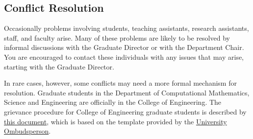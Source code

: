 \subsection{Conflict Resolution}

Occasionally problems involving students, teaching assistants,
research assistants, staff, and faculty arise.  Many of these problems
are likely to be resolved by informal discussions with the Graduate
Director or with the Department Chair.  You are encouraged to contact
these individuals with any issues that may arise, starting with the
Graduate Director.

In rare cases, however, some conflicts may need a more formal
mechanism for resolution.  Graduate students in the Department of
Computational Mathematics, Science and Engineering are officially in
the College of Engineering.  The grievance procedure for College of
Engineering graduate students is described by
\href{https://www.egr.msu.edu/sites/default/files/content/GRAD/2015\%20Grievance\%20Hearing\%20Procedure.pdf}{this
document}, which is based on the template provided by the
\href{https://msu.edu/unit/ombud/grievance-procedures/index.html}{University
Ombudsperson}.







